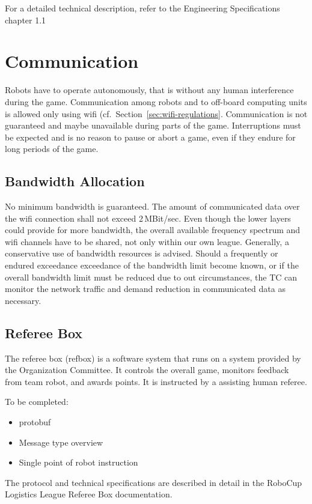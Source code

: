 \documentclass[12pt,twoside]{article}
\newcommand{\refsec}[1]{Section~\ref{#1}}
\begin{document}
For a detailed technical description, refer to the Engineering
Specifications chapter 1.1 

\section{Communication}
Robots have to operate autonomously, that is without any human
interference during the game. Communication among robots and to
off-board computing units is allowed only using wifi
(cf.~\refsec{sec:wifi-regulations}. Communication is not guaranteed
and maybe unavailable during parts of the game. Interruptions must be
expected and is no reason to pause or abort a game, even if they
endure for long periods of the game.

\subsection{Bandwidth Allocation}
\label{sec:bandwidth}
No minimum bandwidth is guaranteed. The amount of communicated data
over the wifi connection shall not exceed 2\,MBit/sec. Even though the
lower layers could provide for more bandwidth, the overall available
frequency spectrum and wifi channels have to be shared, not only
within our own league. Generally, a conservative use of bandwidth
resources is advised. Should a frequently or endured exceedance
exceedance of the bandwidth limit become known, or if the overall
bandwidth limit must be reduced due to out circumstances, the TC can
monitor the network traffic and demand reduction in communicated
data as necessary.

\subsection{Referee Box}
\label{sec:refbox}
The referee box (refbox) is a software system that runs on a system
provided by the Organization Committee. It controls the overall game,
monitors feedback from team robot, and awards points. It is instructed
by a assisting human referee.

To be completed:
\begin{itemize}
\item protobuf
\item Message type overview
\item Single point of robot instruction
\end{itemize}

The protocol and technical specifications are described in detail in
the RoboCup Logistics League Referee Box documentation.
\end{document}
